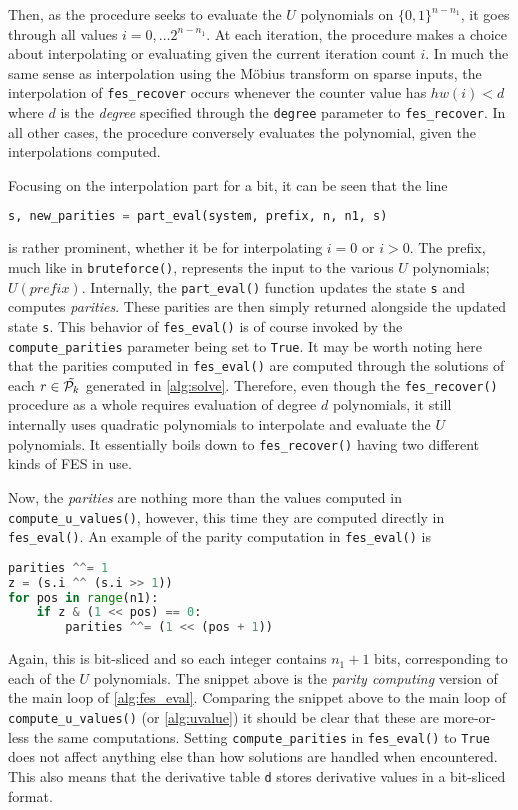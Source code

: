 Then, as the procedure seeks to evaluate the $U$ polynomials on $\{0,1\}^{n - n_1}$, it goes through all values $i = 0, \dots 2^{n - n_1}$. At each iteration, the procedure makes a choice about interpolating or evaluating given the current iteration count $i$. In much the same sense as interpolation using the Möbius transform on sparse inputs, the interpolation of \texttt{fes\_recover} occurs whenever the counter value has $hw(i) < d$ where $d$ is the \textit{degree} specified through the \texttt{degree} parameter to \texttt{fes\_recover}. In all other cases, the procedure conversely evaluates the polynomial, given the interpolations computed.

Focusing on the interpolation part for a bit, it can be seen that the line
\begin{lstlisting}[language=Python,style=mystyle]
s, new_parities = part_eval(system, prefix, n, n1, s)
\end{lstlisting}
is rather prominent, whether it be for interpolating $i = 0$ or $i > 0$. The prefix, much like in \texttt{bruteforce()}, represents the input to the various $U$ polynomials; $U(prefix)$. Internally, the \texttt{part\_eval()} function updates the state \texttt{s} and computes \textit{parities}. These parities are then simply returned alongside the updated state \texttt{s}. This behavior of \texttt{fes\_eval()} is of course invoked by the \texttt{compute\_parities} parameter being set to \texttt{True}. It may be worth noting here that the parities computed in \texttt{fes\_eval()} are computed through the solutions of each $r \in \Tilde{\mathcal{P}_k}$ generated in \cref{alg:solve}. Therefore, even though the \texttt{fes\_recover()} procedure as a whole requires evaluation of degree $d$ polynomials, it still internally uses quadratic polynomials to interpolate and evaluate the $U$ polynomials. It essentially boils down to \texttt{fes\_recover()} having two different kinds of FES in use.

Now, the \textit{parities} are nothing more than the values computed in \texttt{compute\_u\_values()}, however, this time they are computed directly in \texttt{fes\_eval()}. An example of the parity computation in \texttt{fes\_eval()} is 
\begin{lstlisting}[language=Python,style=mystyle]
parities ^^= 1
z = (s.i ^^ (s.i >> 1))
for pos in range(n1):
    if z & (1 << pos) == 0:
        parities ^^= (1 << (pos + 1))
\end{lstlisting}
Again, this is bit-sliced and so each integer contains $n_1 + 1$ bits, corresponding to each of the $U$ polynomials. The snippet above is the \textit{parity computing} version of the main loop of \cref{alg:fes_eval}. Comparing the snippet above to the main loop of \texttt{compute\_u\_values()} (or \cref{alg:uvalue}) it should be clear that these are more-or-less the same computations. Setting \texttt{compute\_parities} in \texttt{fes\_eval()} to \texttt{True} does not affect anything else than how solutions are handled when encountered. This also means that the derivative table \texttt{d} stores derivative values in a bit-sliced format.

